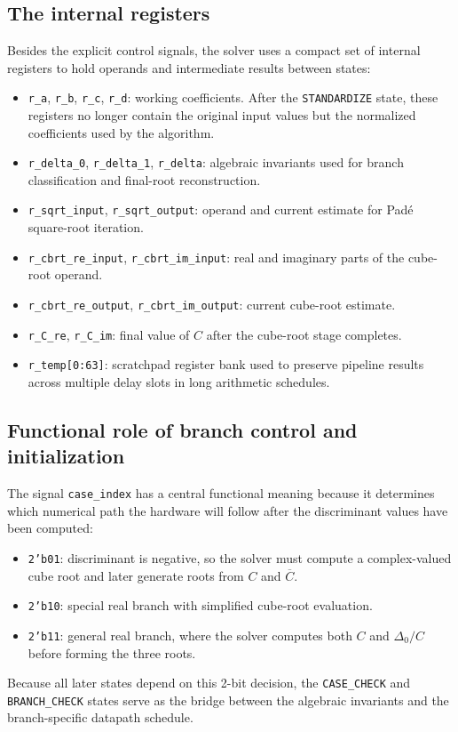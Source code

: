 \subsection{The internal registers}

Besides the explicit control signals, the solver uses a compact set of internal registers to hold operands and intermediate results between states:
\begin{itemize}[noitemsep]
    \item \texttt{r\_a}, \texttt{r\_b}, \texttt{r\_c}, \texttt{r\_d}: working coefficients. After the \texttt{STANDARDIZE} state, these registers no longer contain the original input values but the normalized coefficients used by the algorithm.
    \item \texttt{r\_delta\_0}, \texttt{r\_delta\_1}, \texttt{r\_delta}: algebraic invariants used for branch classification and final-root reconstruction.
    \item \texttt{r\_sqrt\_input}, \texttt{r\_sqrt\_output}: operand and current estimate for Pad\'e square-root iteration.
    \item \texttt{r\_cbrt\_re\_input}, \texttt{r\_cbrt\_im\_input}: real and imaginary parts of the cube-root operand.
    \item \texttt{r\_cbrt\_re\_output}, \texttt{r\_cbrt\_im\_output}: current cube-root estimate.
    \item \texttt{r\_C\_re}, \texttt{r\_C\_im}: final value of $C$ after the cube-root stage completes.
    \item \texttt{r\_temp[0:63]}: scratchpad register bank used to preserve pipeline results across multiple delay slots in long arithmetic schedules.
\end{itemize}

\subsection{Functional role of branch control and initialization}

The signal \texttt{case\_index} has a central functional meaning because it determines which numerical path the hardware will follow after the discriminant values have been computed:
\begin{itemize}[noitemsep]
    \item \texttt{2'b01}: discriminant is negative, so the solver must compute a complex-valued cube root and later generate roots from $C$ and $\overline{C}$.
    \item \texttt{2'b10}: special real branch with simplified cube-root evaluation.
    \item \texttt{2'b11}: general real branch, where the solver computes both $C$ and $\Delta_0/C$ before forming the three roots.
\end{itemize}
Because all later states depend on this 2-bit decision, the \texttt{CASE\_CHECK} and \texttt{BRANCH\_CHECK} states serve as the bridge between the algebraic invariants and the branch-specific datapath schedule.

